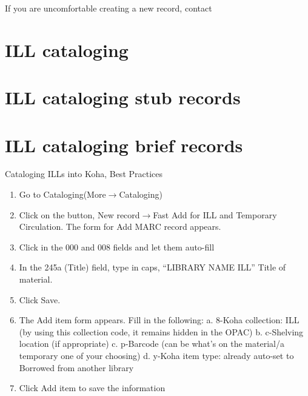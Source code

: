 \documentclass[letterpaper,10pt,english]{sphinxmanual}
\begin{document}

If you are uncomfortable creating a new record, contact


\chapter{ILL cataloging}
\label{\detokenize{ill-cataloging/README:ill-cataloging}}\label{\detokenize{ill-cataloging/README::doc}}

\chapter{ILL cataloging stub records}
\label{\detokenize{ill-cataloging/ill-cataloging-stub-records:ill-cataloging-stub-records}}\label{\detokenize{ill-cataloging/ill-cataloging-stub-records::doc}}

\chapter{ILL cataloging brief records}
\label{\detokenize{ill-cataloging/ill-cataloging-brief-records:ill-cataloging-brief-records}}\label{\detokenize{ill-cataloging/ill-cataloging-brief-records::doc}}
Cataloging ILLs into Koha, Best Practices
\begin{enumerate}
\item {} 
Go to ​Cataloging​ (​More​\(\rightarrow\)​Cataloging​)

\item {} 
Click on the button, ​New record​ ​\(\rightarrow\)​ ​Fast Add for ILL and Temporary
Circulation​. The form for ​Add MARC​ record appears.

\item {} 
Click in the ​000​ and ​008​ fields and let them auto-fill

\item {} 
In the ​245a​ (Title) field, type in caps, “LIBRARY NAME ILL” Title
of material.

\item {} 
Click ​Save​.

\item {} 
The ​Add item​ form appears. Fill in the following: a. 8-Koha
collection​: ILL (by using this collection code, it remains hidden in
the OPAC) b. c-Shelving location​ (if appropriate) c. p-Barcode​ (can
be what’s on the material/a temporary one of your choosing) d.
​y-Koha item type​: already auto-set to Borrowed from another library

\item {} 
Click ​Add item​ to save the information

\end{enumerate}
\end{document}
